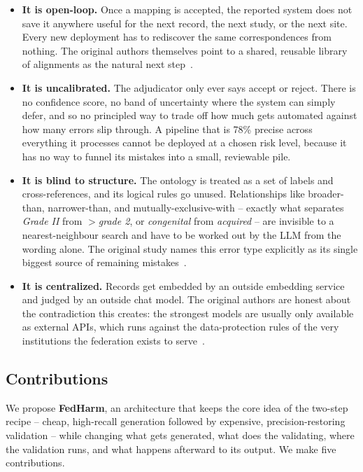 \documentclass[conference]{IEEEtran}
\begin{document}
\begin{itemize}
\item \textbf{It is open-loop.} Once a mapping is accepted, the reported system does not save it anywhere useful for the next record, the next study, or the next site. Every new deployment has to rediscover the same correspondences from nothing. The original authors themselves point to a shared, reusable library of alignments as the natural next step~\cite{b1}.
\item \textbf{It is uncalibrated.} The adjudicator only ever says accept or reject. There is no confidence score, no band of uncertainty where the system can simply defer, and so no principled way to trade off how much gets automated against how many errors slip through. A pipeline that is 78\% precise across everything it processes cannot be deployed at a chosen risk level, because it has no way to funnel its mistakes into a small, reviewable pile.
\item \textbf{It is blind to structure.} The ontology is treated as a set of labels and cross-references, and its logical rules go unused. Relationships like broader-than, narrower-than, and mutually-exclusive-with -- exactly what separates \emph{Grade II} from \emph{$>$grade 2}, or \emph{congenital} from \emph{acquired} -- are invisible to a nearest-neighbour search and have to be worked out by the LLM from the wording alone. The original study names this error type explicitly as its single biggest source of remaining mistakes~\cite{b1}.
\item \textbf{It is centralized.} Records get embedded by an outside embedding service and judged by an outside chat model. The original authors are honest about the contradiction this creates: the strongest models are usually only available as external APIs, which runs against the data-protection rules of the very institutions the federation exists to serve~\cite{b1,b45}.
\end{itemize}

\subsection{Contributions}

We propose \textbf{FedHarm}, an architecture that keeps the core idea of the two-step recipe -- cheap, high-recall generation followed by expensive, precision-restoring validation -- while changing what gets generated, what does the validating, where the validation runs, and what happens afterward to its output. We make five contributions.
\end{document}
